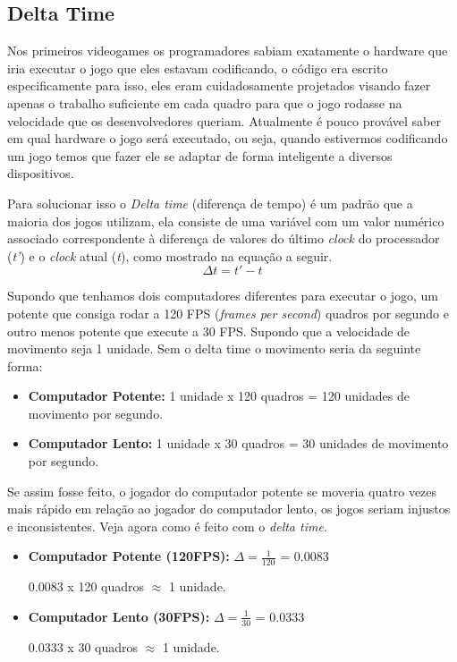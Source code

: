 \subsection{Delta Time}
\label{sec:delta-time}
Nos primeiros videogames os programadores sabiam exatamente o hardware que iria executar o jogo que eles estavam codificando, o código era escrito especificamente para isso, eles eram cuidadosamente projetados visando fazer apenas o trabalho suficiente em cada quadro para que o jogo rodasse na velocidade que os desenvolvedores queriam. Atualmente é pouco provável saber em qual hardware o jogo será executado, ou seja, quando estivermos codificando um jogo temos que fazer ele se adaptar de forma inteligente a diversos dispositivos.

 Para solucionar isso o \textit{Delta time} (diferença de tempo) é um padrão que a maioria dos jogos utilizam, ela consiste de uma variável com um valor numérico associado correspondente à diferença de valores do último \textit{clock} do processador (\textit{t'}) e o \textit{clock} atual (\textit{t}), como mostrado na equação a seguir.
 \begin{equation}
    \Delta t = t' - t
    \label{eq:dt_equation}
\end{equation}

Supondo que tenhamos dois computadores diferentes para executar o jogo, um potente que consiga rodar a 120 FPS (\textit{frames per second}) quadros por segundo e outro menos potente que execute a 30 FPS. Supondo que a velocidade de movimento seja 1 unidade. Sem o delta time o movimento seria da seguinte forma:
\begin{itemize}
    \item \textbf{Computador Potente:} 1 unidade x 120 quadros = 120 unidades de movimento por segundo.
    \item \textbf{Computador Lento:} 1 unidade x 30 quadros = 30 unidades de movimento por segundo.
\end{itemize}

Se assim fosse feito, o jogador do computador potente se moveria quatro vezes mais rápido em relação ao jogador do computador lento, os jogos seriam injustos e inconsistentes. Veja agora como é feito com o \textit{delta time}.
\begin{itemize}
    \item \textbf{Computador Potente (120FPS):} \( \Delta = \frac{1}{120}\) = 0.0083 
    
    0.0083 x 120 quadros \begin{math} \approx\end{math} 1 unidade.
    \item \textbf{Computador Lento (30FPS):} \( \Delta = \frac{1}{30}\) = 0.0333 
    
    0.0333 x 30 quadros \begin{math} \approx\end{math} 1 unidade.
\end{itemize}

